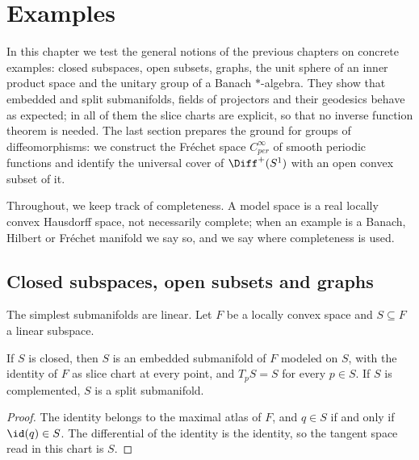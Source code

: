 \chapter{Examples}
\label{chap:examples}

In this chapter we test the general notions of the previous chapters on concrete examples:
closed subspaces, open subsets, graphs, the unit sphere of an inner product space and the unitary
group of a Banach $*$-algebra. They show that embedded and split submanifolds, fields of
projectors and their geodesics behave as expected; in all of them the slice charts are explicit,
so that no inverse function theorem is needed. The last section prepares the ground for groups of
diffeomorphisms: we construct the Fréchet space $C^\infty_{per}$ of smooth periodic functions and
identify the universal cover of $\Diff^+(S^1)$ with an open convex subset of it.

Throughout, we keep track of completeness. A model space is a real locally convex Hausdorff
space, not necessarily complete; when an example is a Banach, Hilbert or Fréchet manifold we say
so, and we say where completeness is used.

\section{Closed subspaces, open subsets and graphs}

The simplest submanifolds are linear. Let $F$ be a locally convex space and $S \subseteq F$ a
linear subspace.

\begin{proposition}
  \label{prop:ex-subspace}
  \leanok
  If $S$ is closed, then $S$ is an embedded submanifold of $F$ modeled on $S$, with the identity
  of $F$ as slice chart at every point, and $T_pS = S$ for every $p \in S$. If $S$ is
  complemented, $S$ is a split submanifold.
\end{proposition}

\begin{proof}
  \leanok
  The identity belongs to the maximal atlas of $F$, and $q \in S$ if and only if
  $\id(q) \in S$. The differential of the identity is the identity, so the tangent space read
  in this chart is $S$.
\end{proof}

